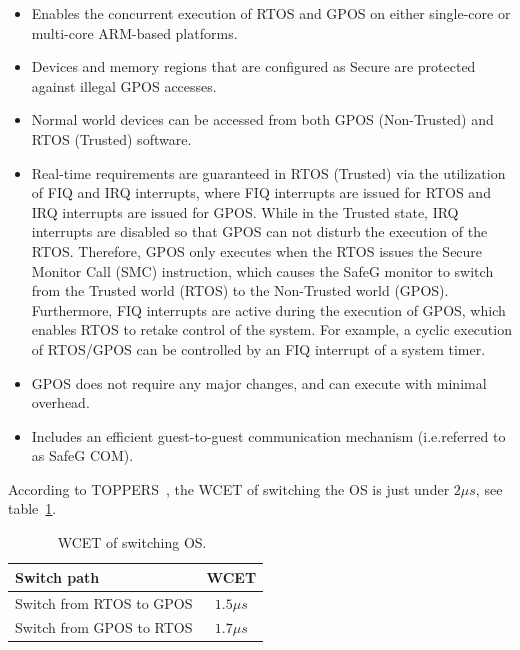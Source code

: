 \begin{itemize}
\item Enables the concurrent execution of RTOS and GPOS on either single-core or multi-core ARM-based platforms.

\item Devices and memory regions that are configured as Secure are protected against illegal GPOS accesses.

\item Normal world devices can be accessed from both GPOS (Non-Trusted) and RTOS (Trusted) software.

\item Real-time requirements are guaranteed in RTOS (Trusted) via the utilization of FIQ and IRQ interrupts, where FIQ interrupts are issued for RTOS and IRQ interrupts are issued for GPOS. While in the Trusted state, IRQ interrupts are disabled so that GPOS can not disturb the execution of the RTOS. Therefore, GPOS only executes when the RTOS issues the Secure Monitor Call (SMC) instruction, which causes the SafeG monitor to switch from the Trusted world (RTOS) to the Non-Trusted world (GPOS). Furthermore, FIQ interrupts are active during the execution of GPOS, which enables RTOS to retake control of the system. For example, a cyclic execution of RTOS/GPOS can be controlled by an FIQ interrupt of a system timer.

\item GPOS does not require any major changes, and can execute with minimal overhead.

\item Includes an efficient guest-to-guest communication mechanism (i.e.referred to as SafeG COM).
\end{itemize}

According to TOPPERS~\cite{safegswitch}, the WCET of switching the OS is just under $2 \mu s$, see table~\ref{table:safegswitch}.

\begin{table}[H]
\centering
\begin{tabular}{|l|c|}
\hline
Switch path & WCET\\ \hline
Switch from RTOS to GPOS & $1.5 \mu s$\\ \hline
Switch from GPOS to RTOS & $1.7 \mu s$\\ \hline
\end{tabular}
\caption{WCET of switching OS.~\cite{safegswitch}}
\label{table:safegswitch}
\end{table}

